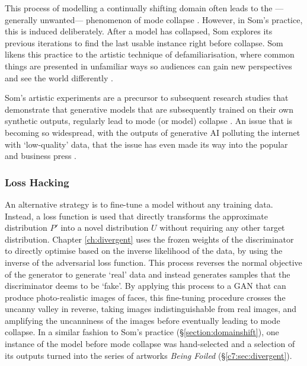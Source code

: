 This process of modelling a continually shifting domain often leads to the ---generally unwanted--- phenomenon of mode collapse \citep{thanh2020catastrophic}. 
However, in Som's practice, this is induced deliberately. After a model has collapsed, Som explores its previous iterations to find the last usable instance right before collapse. 
Som likens this practice to the artistic technique of defamiliarisation, where common things are presented in unfamiliar ways so audiences can gain new perspectives and see the world differently \citep{som2021personal}.

Som's artistic experiments are a precursor to subsequent research studies that demonstrate that generative models that are subsequently trained on their own synthetic outputs, regularly lead to mode (or model) collapse \citep{alemohammad2023self, martinez2023combining, shumailov2023curse, shumailov2024ai}. An issue that is becoming so widespread, with the outputs of generative AI polluting the internet with `low-quality' data, that the issue has even made its way into the popular and business press \citep{peel2024problem,aatish2024threat}.

\subsubsection{Loss Hacking} 

An alternative strategy is to fine-tune a model without any training data. 
Instead, a loss function is used that directly transforms the approximate distribution $P'$ into a novel distribution $U$ without requiring any other target distribution. 
Chapter \ref{ch:divergent} uses the frozen weights of the discriminator to directly optimise based on the inverse likelihood of the data, by using the inverse of the adversarial loss function. 
This process reverses the normal objective of the generator to generate `real' data and instead generates samples that the discriminator deems to be `fake'. 
By applying this process to a GAN that can produce photo-realistic images of faces, this fine-tuning procedure crosses the uncanny valley in reverse, taking images indistinguishable from real images, and amplifying the uncanniness of the images before eventually leading to mode collapse. 
In a similar fashion to Som's practice (\S \ref{section:domainshift}), one instance of the model before mode collapse was hand-selected and a selection of its outputs turned into the series of artworks \textit{Being Foiled} \citep{broad2020being} (\S \ref{c7:sec:divergent}).

